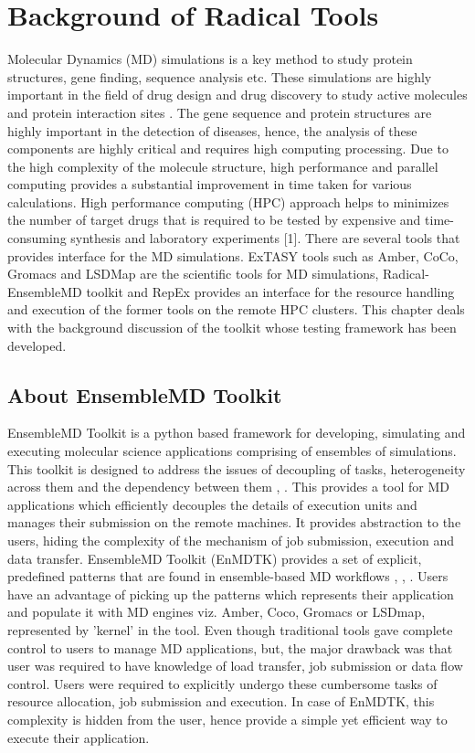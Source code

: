 \documentclass[10pt]{ruthesis}
\begin{document}
\chapter{Background of Radical Tools}
\label{chap:background}
Molecular Dynamics (MD) simulations is a key method to study protein structures, gene finding, sequence analysis etc. These simulations are highly important in the field of drug design and drug discovery to study active molecules and protein interaction sites \cite{ref1}. The gene sequence and protein structures are highly important in the detection of diseases, hence, the analysis of these components are highly critical and requires high computing processing. Due to the high complexity of the molecule structure, high performance and parallel computing provides a substantial improvement in time taken for various calculations. High performance computing (HPC) approach helps to minimizes the number of target drugs that is required to be tested by expensive and time-consuming synthesis and laboratory experiments [1]. There are several tools that provides interface for the MD simulations. ExTASY tools such as Amber, CoCo, Gromacs and LSDMap are the scientific tools for MD simulations, Radical-EnsembleMD toolkit and RepEx provides an interface for the resource handling and execution of the former tools on the remote HPC clusters. This chapter deals with the background discussion of the toolkit whose testing framework has been developed.

\section{About EnsembleMD Toolkit}
EnsembleMD Toolkit is a python based framework for developing, simulating and executing molecular science applications comprising of ensembles of simulations. This toolkit is designed to address the issues of decoupling of tasks, heterogeneity across them and the dependency between them \cite{ref3}, \cite{site1}. This provides a tool for MD applications which efficiently decouples the details of execution units and manages their submission on the remote machines. It provides abstraction to the users, hiding the complexity of the mechanism of job submission, execution and data transfer. EnsembleMD Toolkit (EnMDTK) provides a set of explicit, predefined patterns that are found in ensemble-based MD workflows \cite{ref2}, \cite{ref3}, \cite{site1} . Users have an advantage of picking up the patterns which represents their application and populate it with MD engines viz. Amber, Coco, Gromacs or LSDmap, represented by 'kernel' in the tool. Even though traditional tools gave complete control to users to manage MD applications, but, the major drawback was that user was required to have knowledge of load transfer, job submission or data flow control. Users were required to explicitly undergo these cumbersome tasks of resource allocation, job submission and execution. In case of EnMDTK, this complexity is hidden from the user, hence provide a simple yet efficient way to execute their application.
\end{document}

